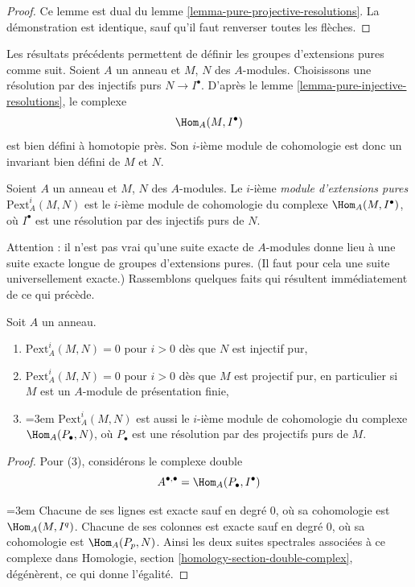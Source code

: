 \begin{proof}
Ce lemme est dual du
lemme \ref{lemma-pure-projective-resolutions}.
La démonstration est identique, sauf qu'il faut renverser toutes les flèches.
\end{proof}

\noindent
Les résultats précédents permettent de définir les groupes d'extensions pures
comme suit. Soient $A$ un anneau et $M$, $N$ des $A$-modules.
Choisissons une résolution par des injectifs purs $N \to I^\bullet$. D'après le
lemme \ref{lemma-pure-injective-resolutions},
le complexe
$$
\Hom_A(M, I^\bullet)
$$
est bien défini à homotopie près. Son $i$-ième module de cohomologie
est donc un invariant bien défini de $M$ et $N$.

\begin{definition}
\label{definition-pure-ext}
Soient $A$ un anneau et $M$, $N$ des $A$-modules.
Le $i$-ième {\it module d'extensions pures} $\text{Pext}^i_A(M, N)$
est le $i$-ième module de cohomologie du complexe
$\Hom_A(M, I^\bullet)$, où $I^\bullet$ est une résolution par des injectifs purs
de $N$.
\end{definition}

\noindent
Attention : il n'est pas vrai qu'une suite exacte de $A$-modules donne
lieu à une suite exacte longue de groupes d'extensions pures. (Il faut
pour cela une suite universellement exacte.)
Rassemblons quelques faits qui résultent immédiatement de ce qui précède.

\begin{lemma}
\label{lemma-facts-pext}
Soit $A$ un anneau.
\begin{enumerate}
\item $\text{Pext}^i_A(M, N) = 0$ pour $i > 0$ dès que $N$ est injectif pur,
\item $\text{Pext}^i_A(M, N) = 0$ pour $i > 0$ dès que $M$ est projectif pur,
en particulier si $M$ est un $A$-module de présentation finie,
\item {\emergencystretch=3em
$\text{Pext}^i_A(M, N)$ est aussi le $i$-ième module de cohomologie
du complexe $\Hom_A(P_\bullet, N)$, où $P_\bullet$
est une résolution par des projectifs purs de $M$.\par}
\end{enumerate}
\end{lemma}

\begin{proof}
Pour (3), considérons le complexe double
$$
A^{\bullet, \bullet} = \Hom_A(P_\bullet, I^\bullet)
$$
{\emergencystretch=3em
Chacune de ses lignes est exacte sauf en degré $0$, où sa cohomologie
est $\Hom_A(M, I^q)$. Chacune de ses colonnes est exacte sauf en degré $0$,
où sa cohomologie est $\Hom_A(P_p, N)$. Ainsi les deux suites spectrales
associées à ce complexe dans
Homologie, section \ref{homology-section-double-complex},
dégénèrent, ce qui donne l'égalité.\par}
\end{proof}





